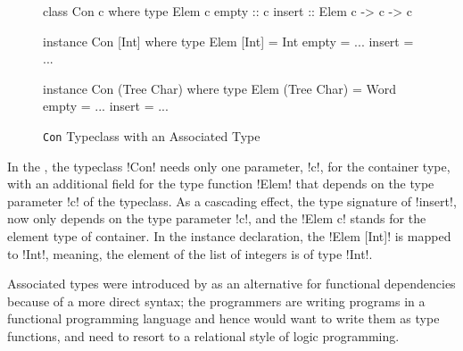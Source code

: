\documentclass[screen,nonacm]{acmart}
\begin{document}
\begin{figure}[ht]
\begin{center}
\begin{minipage}[ht]{0.3\linewidth}
\begin{CenteredBox}
\begin{code}
class Con c where
  type Elem c
  empty :: c
  insert :: Elem c -> c -> c
\end{code}
\end{CenteredBox}
\end{minipage}%
\begin{minipage}[ht]{0.3\linewidth}
\begin{CenteredBox}
\begin{code}
instance Con [Int] where
  type Elem [Int] = Int
  empty = ...
  insert = ...
\end{code}
\end{CenteredBox}
\end{minipage}%
\begin{minipage}[ht]{0.3\linewidth}
\begin{CenteredBox}
\begin{code}
instance Con (Tree Char) where
  type Elem (Tree Char) = Word
  empty = ...
  insert = ...
\end{code}
\end{CenteredBox}
\end{minipage}
\end{center}
\caption[Con typeclass]{\lstinline{Con} Typeclass with an Associated Type}
\label{fig:assoc-types}
\end{figure}

In the , the typeclass !Con! needs only one
parameter, !c!, for the container type, with an additional field for
the type function !Elem! that depends on the type parameter !c! of the
typeclass. As a cascading effect, the type signature of !insert!, now only depends on
the type parameter !c!, and the !Elem c! stands for the element
type of container. In the instance declaration, the !Elem [Int]! is mapped to
!Int!, meaning, the element of the list of integers is of type !Int!.

Associated types were introduced by
\citet{chakravarty_associated_2005}
as an alternative for functional dependencies because of a more
direct syntax; the programmers are writing programs in a functional
programming language and hence would want to write them as type
functions, and need to resort to a relational style of logic programming.
\end{document}
